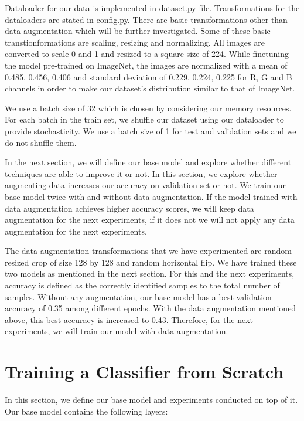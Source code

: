 \documentclass{article}
\begin{document}
Dataloader for our data is implemented in dataset.py file. Transformations for the dataloaders are stated in config.py. There are basic transformations other than data augmentation which will be further investigated. Some of these basic transtionformations are scaling, resizing and normalizing. All images are converted to scale 0 and  1 and resized to a square size of 224. While finetuning the model pre-trained on ImageNet, the images are normalized with a mean of 0.485, 0.456, 0.406 and standard deviation of 0.229, 0.224, 0.225 for R, G and B channels in order to make our dataset's distribution similar to that of ImageNet.

We use a batch size of 32 which is chosen by considering our memory resources. For each batch in the train set,  we shuffle our dataset using our dataloader to provide stochasticity. We use a batch size of 1 for test and validation sets and we do not shuffle them.

In the next section, we will define our base model and explore whether different techniques are able to improve it or not. In this section, we explore whether augmenting data increases our accuracy on validation set or not. We train our base model twice with and without data augmentation. If the model trained with data augmentation achieves higher accuracy scores, we will keep data augmentation for the next experiments, if it does not we will not apply any data augmentation for the next experiments.

The data augmentation transformations that we have experimented are random resized crop of size 128 by 128 and random horizontal flip. We have trained these two models as mentioned in the next section. For this and the next experiments, accuracy is defined as the correctly identified samples to the total number of samples. Without any augmentation, our base model has a best validation accuracy of 0.35 among different epochs. With the data augmentation mentioned above, this best accuracy is increased to 0.43. Therefore, for the next experiments, we will train our model with data augmentation.

\section{Training a Classifier from Scratch}

In this section, we define our base model and experiments conducted on top of it. Our base model contains the following layers:
\end{document}
